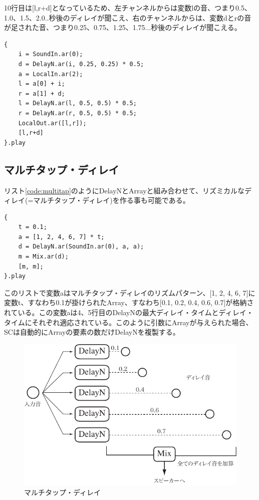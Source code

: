 \documentclass{jsarticle}
\begin{document}
10行目は[l,r+d]となっているため、左チャンネルからは変数lの音、つまり0.5、1.0、1.5、2.0..秒後のディレイが聞こえ、右のチャンネルからは、変数dとrの音が足された音、つまり0.25、0.75、1.25、1.75...秒後のディレイが聞こえる。

\begin{lstlisting}[caption=ピンポン・ディレイ, label=code:pp]
{
	i = SoundIn.ar(0);
	d = DelayN.ar(i, 0.25, 0.25) * 0.5;
	a = LocalIn.ar(2);
	l = a[0] + i;
	r = a[1] + d;
	l = DelayN.ar(l, 0.5, 0.5) * 0.5; 
	r = DelayN.ar(r, 0.5, 0.5) * 0.5;
	LocalOut.ar([l,r]);
	[l,r+d]
}.play
\end{lstlisting}

\subsection{マルチタップ・ディレイ}
リスト\ref{code:multitap}のようにDelayNとArrayと組み合わせて、リズミカルなディレイ(=マルチタップ・ディレイ)を作る事も可能である。

\begin{lstlisting}[caption=マルチタップ・ディレイ, label=code:multitap]
{
	t = 0.1;
	a = [1, 2, 4, 6, 7] * t;
	d = DelayN.ar(SoundIn.ar(0), a, a);
	m = Mix.ar(d);
	[m, m];
}.play
\end{lstlisting}

このリストで変数aはマルチタップ・ディレイのリズムパターン、[1, 2, 4, 6, 7]に変数t、すなわち0.1が掛けられたArray、すなわち[0.1, 0.2, 0.4, 0.6, 0.7]が格納されている。この変数aは4、5行目のDelayNの最大ディレイ・タイムとディレイ・タイムにそれぞれ適応されている。このように引数にArrayが与えられた場合、SCは自動的にArrayの要素の数だけDelayNを複製する。

\begin{figure}[htbp]
	\begin{center}
		\includegraphics[scale=0.7]{multitap.pdf}
	\end{center}
	\caption{マルチタップ・ディレイ}
	\label{fig:multitap}
\end{figure}
\end{document}
